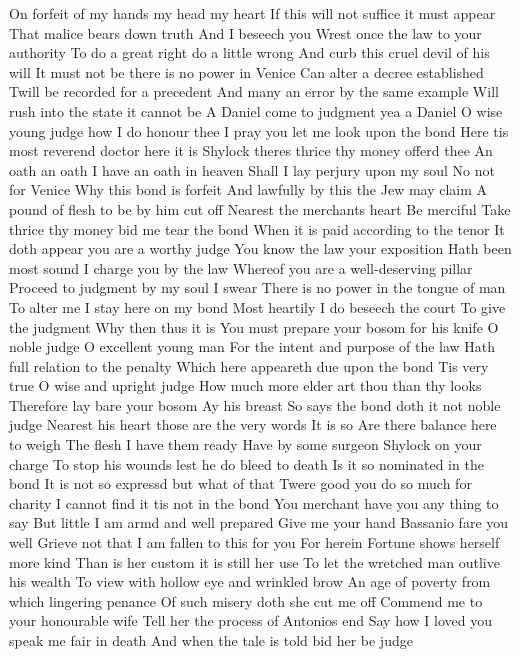 On forfeit of my hands my head my heart 
If this will not suffice it must appear 
That malice bears down truth And I beseech you 
Wrest once the law to your authority 
To do a great right do a little wrong 
And curb this cruel devil of his will 
It must not be there is no power in Venice 
Can alter a decree established 
Twill be recorded for a precedent 
And many an error by the same example 
Will rush into the state it cannot be 
A Daniel come to judgment yea a Daniel 
O wise young judge how I do honour thee 
I pray you let me look upon the bond 
Here tis most reverend doctor here it is 
Shylock theres thrice thy money offerd thee 
An oath an oath I have an oath in heaven 
Shall I lay perjury upon my soul 
No not for Venice 
Why this bond is forfeit 
And lawfully by this the Jew may claim 
A pound of flesh to be by him cut off 
Nearest the merchants heart Be merciful 
Take thrice thy money bid me tear the bond 
When it is paid according to the tenor 
It doth appear you are a worthy judge 
You know the law your exposition 
Hath been most sound I charge you by the law 
Whereof you are a well-deserving pillar 
Proceed to judgment by my soul I swear 
There is no power in the tongue of man 
To alter me I stay here on my bond 
Most heartily I do beseech the court 
To give the judgment 
Why then thus it is 
You must prepare your bosom for his knife 
O noble judge O excellent young man 
For the intent and purpose of the law 
Hath full relation to the penalty 
Which here appeareth due upon the bond 
Tis very true O wise and upright judge 
How much more elder art thou than thy looks 
Therefore lay bare your bosom 
Ay his breast 
So says the bond doth it not noble judge 
Nearest his heart those are the very words 
It is so Are there balance here to weigh 
The flesh 
I have them ready 
Have by some surgeon Shylock on your charge 
To stop his wounds lest he do bleed to death 
Is it so nominated in the bond 
It is not so expressd but what of that 
Twere good you do so much for charity 
I cannot find it tis not in the bond 
You merchant have you any thing to say 
But little I am armd and well prepared 
Give me your hand Bassanio fare you well 
Grieve not that I am fallen to this for you 
For herein Fortune shows herself more kind 
Than is her custom it is still her use 
To let the wretched man outlive his wealth 
To view with hollow eye and wrinkled brow 
An age of poverty from which lingering penance 
Of such misery doth she cut me off 
Commend me to your honourable wife 
Tell her the process of Antonios end 
Say how I loved you speak me fair in death 
And when the tale is told bid her be judge 
